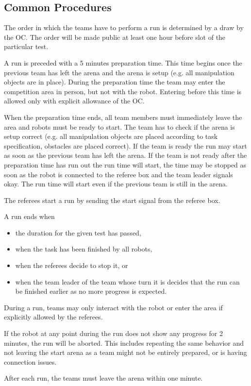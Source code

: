 \subsection{Common Procedures} 
The order in which the teams have to perform a run is determined by a draw by the OC. The order will be made public at least one hour before slot of the particular test.
\par
A run is preceded with a 5 minutes preparation time. This time begins once the previous team has left the arena and the arena is setup (e.g. all manipulation objects are in place). During the preparation time the team may enter the competition area in person, but not with the robot. Entering before this time is allowed only with explicit allowance of the OC.
\par
When the preparation time ends, all team members must immediately leave the area and robots must be ready to start. The team has to check if the arena is setup correct (e.g. all manipulation objects are placed according to task specification, obstacles are placed correct). If the team is ready the run may start as soon as the previous team has left the arena. If the team is not ready after the preparation time has run out the run time will start, the time may be stopped as soon as the robot is connected to the referee box and the team leader signals okay. The run time will start even if the previous team is still in the arena.


\par
The referees start a run by sending the start signal from the referee box.
\par
A run ends when 
\begin{itemize}
	\item the duration for the given test has passed,
	\item when the task has been finished by all robots,
	\item when the referees decide to stop it, or 
	\item when the team leader of the team whose turn it is decides that the run can be finished earlier as no more progress is expected.
\end{itemize}
\par
During a run, teams may only interact with the robot or enter the area if explicitly allowed by the referees.
\par
If the robot at any point during the run does not show any progress for 2 minutes, the run will be aborted. This includes repeating the same behavior and not leaving the start arena as a team might not be entirely prepared, or is having connection issues.
\par
After each run, the teams must leave the arena within one minute.

